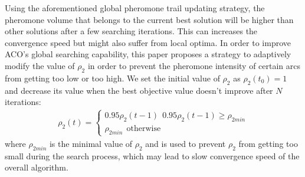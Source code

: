 Using the aforementioned global pheromone trail updating strategy, the pheromone volume that belongs to the current best solution will be higher than other solutions after a few searching iterations.
This can increases the convergence speed but might also suffer from local optima.
In order to improve ACO's global searching capability, this paper proposes a strategy to adaptively modify the value of $\rho_2$ in order to prevent the pheromone intensity of certain arcs from getting too low or too high.
We set the initial value of $\rho_2$ as $\rho_2(t_0) = 1$ and decrease its value when the best objective value doesn't improve after $N$ iterations:
\begin{align}
	\rho_2(t) = \begin{cases}
	0.95 \rho_2(t - 1) \ \ 0.95 \rho_2(t - 1) \geq \rho_{2 min} \\
	\rho_{2min}  \ \ \text{otherwise}
	\end{cases} \label{formula11}
\end{align}
where $\rho_{2min}$ is the minimal value of $\rho_2$ and is used to prevent $\rho_2$ from getting too small during the search process, which may lead to slow convergence speed of the overall algorithm.




